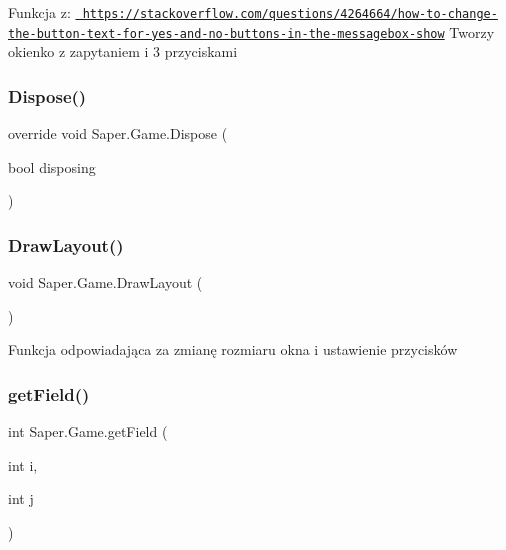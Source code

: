 Funkcja z\+: \href{https://stackoverflow.com/questions/4264664/how-to-change-the-button-text-for-yes-and-no-buttons-in-the-messagebox-show}{\texttt{ https\+://stackoverflow.\+com/questions/4264664/how-\/to-\/change-\/the-\/button-\/text-\/for-\/yes-\/and-\/no-\/buttons-\/in-\/the-\/messagebox-\/show}} Tworzy okienko z zapytaniem i 3 przyciskami \mbox{\label{class_saper_1_1_game_af10b28306097f647aea5dbc84196fcd1}} 
\subsubsection{\texorpdfstring{Dispose()}{Dispose()}}
{\footnotesize\ttfamily override void Saper.\+Game.\+Dispose (\begin{DoxyParamCaption}\item[{bool}]{disposing }\end{DoxyParamCaption})\hspace{0.3cm}{\ttfamily [protected]}}

\mbox{\label{class_saper_1_1_game_ae9bce8a78f549e7e728c6b1f290c9d7e}} 
\subsubsection{\texorpdfstring{DrawLayout()}{DrawLayout()}}
{\footnotesize\ttfamily void Saper.\+Game.\+Draw\+Layout (\begin{DoxyParamCaption}{ }\end{DoxyParamCaption})}

Funkcja odpowiadająca za zmianę rozmiaru okna i ustawienie przycisków \mbox{\label{class_saper_1_1_game_a6ad3e962eca53c2dbf6b499a469fa5f2}} 
\subsubsection{\texorpdfstring{getField()}{getField()}}
{\footnotesize\ttfamily int Saper.\+Game.\+get\+Field (\begin{DoxyParamCaption}\item[{int}]{i,  }\item[{int}]{j }\end{DoxyParamCaption})}

